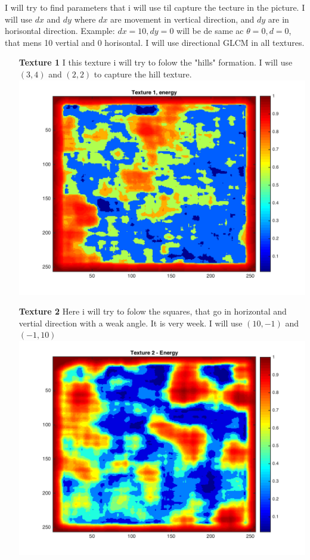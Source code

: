 \documentclass{article}
\begin{document}
I will try to find parameters that i will use til capture the tecture in the picture. I will use $dx$ and $dy$ where $dx$ are movement in vertical direction, and $dy$ are in horisontal direction. Example: $dx = 10, dy = 0$ will be de same ac $\theta = 0, d = 0$, that mens 10 vertial and 0 horisontal.  
I will use directional GLCM in all textures. \\
\begin{itemize}
\item[\textbf{Texture 1}] I this texture i will try to folow the "hills" formation. I will use $(3, 4)$ and $(2, 2)$  to capture the hill texture. \\
\includegraphics[totalheight=5cm]{t1plot.png}

\item[\textbf{Texture 2}]
Here i will try to folow the squares, that go in horizontal and vertial direction with a weak angle. It is very week. I will use $(10, -1)$ and $(-1, 10)$\\
\includegraphics[totalheight=5cm]{t2plot.png}


\end{itemize}
\end{document}
